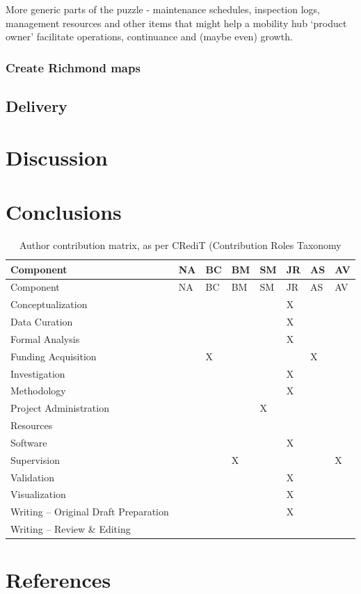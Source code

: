 \documentclass[preprint, 3p,
authoryear]{elsarticle} %
\begin{document}
More generic parts of the puzzle - maintenance schedules, inspection
logs, management resources and other items that might help a mobility
hub `product owner' facilitate operations, continuance and (maybe even)
growth.

\subsubsection{Create Richmond maps}\label{create-richmond-maps}

\subsection{Delivery}\label{delivery}

\section{Discussion}\label{discussion}

\section{Conclusions}\label{conclusions}

\begin{longtable}[]{@{}llllllll@{}}
\caption{Author contribution matrix, as per CRediT (Contribution Roles
Taxonomy}\tabularnewline
\toprule\noalign{}
Component & NA & BC & BM & SM & JR & AS & AV \\
\midrule\noalign{}
\endfirsthead
\toprule\noalign{}
Component & NA & BC & BM & SM & JR & AS & AV \\
\midrule\noalign{}
\endhead
\bottomrule\noalign{}
\endlastfoot
Conceptualization & & & & & X & & \\
Data Curation & & & & & X & & \\
Formal Analysis & & & & & X & & \\
Funding Acquisition & & X & & & & X & \\
Investigation & & & & & X & & \\
Methodology & & & & & X & & \\
Project Administration & & & & X & & & \\
Resources & & & & & & & \\
Software & & & & & X & & \\
Supervision & & & X & & & & X \\
Validation & & & & & X & & \\
Visualization & & & & & X & & \\
Writing -- Original Draft Preparation & & & & & X & & \\
Writing -- Review \& Editing & & & & & & & \\
\end{longtable}

\section*{References}\label{references}

\renewcommand\refname{Appendicies}

\end{document}
